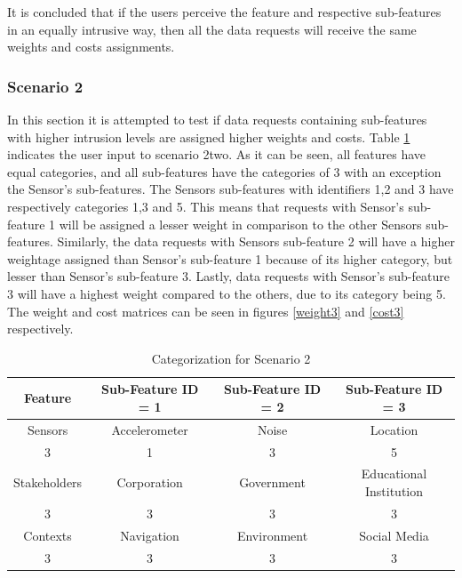 It is concluded that if the users perceive the feature and respective sub-features in an equally intrusive way, then all the
data requests will receive the same weights and costs assignments.

\subsubsection{Scenario 2}
In this section it is attempted to test if data requests containing sub-features with higher intrusion levels are assigned higher weights and costs.
Table \ref{tab:scenario3} indicates the user input to scenario 2two. As it can be seen, all features have equal categories, and
all sub-features have the categories of 3 with an exception the  Sensor's sub-features. The Sensors sub-features with identifiers 1,2 and 3 have respectively categories 1,3 and 5. This means that requests with Sensor's sub-feature 1 will be assigned a lesser weight in comparison to the other Sensors sub-features. Similarly, the data requests
with Sensors sub-feature 2 will have a higher weightage assigned than Sensor's sub-feature 1 because of its higher category, but lesser than Sensor's sub-feature 3. Lastly, data requests with Sensor's sub-feature 3 will have a highest weight compared to the others, due to its category being 5. The weight and cost matrices can be seen in figures \ref{weight3} and \ref{cost3} respectively.

\begin{table}[h!]
  \centering
  \caption{Categorization for Scenario 2}
  \label{tab:scenario3}
  \begin{tabular}{cccc}
    \toprule
    Feature & Sub-Feature ID = 1 & Sub-Feature ID = 2 & Sub-Feature ID = 3\\
    \midrule
    Sensors & Accelerometer & Noise & Location\\
     3 & 1 & 3 & 5\\ \hhline{====}
     Stakeholders & Corporation & Government & Educational Institution\\
     3 & 3 & 3 & 3\\ \hhline{====}
     Contexts & Navigation & Environment & Social Media\\
     3 & 3 & 3 & 3\\ 
    \bottomrule
  \end{tabular}
\end{table}

